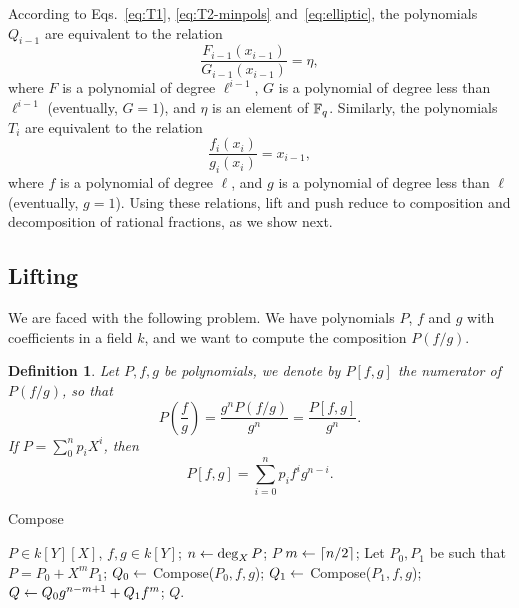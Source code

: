 \documentclass{sig-alternate}
\newtheorem{definition}{Definition}
\begin{document}
According to Eqs.~\eqref{eq:T1}, \eqref{eq:T2-minpols}
and~\eqref{eq:elliptic}, the polynomials $Q_{i-1}$ are equivalent to
the relation
\begin{equation}
  \label{eq:level-i}
  \frac{F_{i-1}(x_{i-1})}{G_{i-1}(x_{i-1})} = \eta,
\end{equation}
where $F$ is a polynomial of degree $\ell^{i-1}$, $G$ is a polynomial
of degree less than $\ell^{i-1}$ (eventually, $G=1$), and $\eta$ is an
element of $\mathbb{F}_q$. Similarly, the polynomials $T_i$ are equivalent to
the relation
\begin{equation}
  \label{eq:level-i+1}
  \frac{f_i(x_i)}{g_i(x_i)} = x_{i-1},
\end{equation}
where $f$ is a polynomial of degree $\ell$, and $g$ is a polynomial of
degree less than $\ell$ (eventually, $g=1$).  Using these relations,
lift and push reduce to composition and decomposition of rational
fractions, as we show next.

\subsection{Lifting}
We are faced with the following problem. We have polynomials $P$, $f$
and $g$ with coefficients in a field $k$, and we want to compute the
composition $P(f/g)$.

\begin{definition}
  Let $P,f,g$ be polynomials, we denote by $P[f,g]$ the numerator of
  $P(f/g)$, so that
  \begin{equation}
    P\left(\frac{f}{g}\right) = \frac{g^nP(f/g)}{g^n} = \frac{P[f,g]}{g^n}.
  \end{equation}
  If $P=\sum_0^np_iX^i$, then
  \begin{equation}
    P[f,g] = \sum_{i=0}^n  p_if^ig^{n-i}.
  \end{equation}
\end{definition}

\begin{algorithm}[t]
  \caption{Compose}
  \label{alg:compose}
  \begin{algorithmic}[1]
    \REQUIRE $P\in k[Y][X]$, $f,g\in k[Y]$;
    \STATE $n \leftarrow \deg_X P$;
    \ENSURE $P$
    \ELSE
    \STATE $m \leftarrow \lceil n/2\rceil$;
    \STATE Let $P_0,P_1$ be such that $P = P_0 + X^mP_1$;
    \STATE $Q_0 \leftarrow$ Compose($P_0, f, g$);
    \STATE $Q_1 \leftarrow$ Compose($P_1, f, g$);
    \STATE \label{alg:compose:res}
    $Q \leftarrow Q_0g^{n-m+1} + Q_1f^m$;
    \ENSURE $Q$.
    \ENDIF
  \end{algorithmic}
\end{algorithm}
\end{document}
